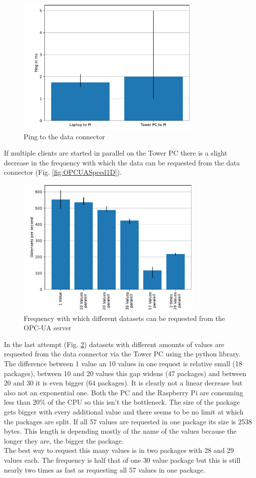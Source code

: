 \documentclass[conference]{IEEEtran}
\begin{document}
\begin{figure}[htbp]
    \centerline{\includegraphics[width=9cm]{Pictures/PingDiagram.pdf}}
    \caption{Ping to the data connector}
    \label{fig:PingDiagram}
\end{figure}
If multiple clients are started in parallel on the Tower PC there is a slight decrease in the frequency with which the data can be requested from the data connector (Fig. \ref{fig:OPCUASpeed1D}).\\
\begin{figure}[htbp]
    \centerline{\includegraphics[width=9.1cm]{Pictures/OPCUAMultipleDatenAufEinmal.pdf}}
    \caption{Frequency with which different datasets can be requested from the OPC-UA server}
    \label{fig:OPCUAMultipleDatenAufEinmal}
\end{figure}
In the last attempt (Fig. \ref{fig:OPCUAMultipleDatenAufEinmal}) datasets with different amounts of values are requested from the data connector via the Tower PC using the python library.
The difference between 1 value an 10 values in one request is relative small (18 packages), between 10 and 20 values this gap widens (47 packages) and between 20 and 30 it is even bigger (64 packages).
It is clearly not a linear decrease but also not an exponential one. 
Both the PC and the Raspberry Pi are consuming less than 20\% of the CPU so this isn't the bottleneck.
The size of the package gets bigger with every additional value and there seems to be no limit at which the packages are split.
If all 57 values are requested in one package its size is 2538 bytes.
This length is depending mostly of the name of the values because the longer they are, the bigger the package.\\
The best way to request this many values is in two packages with 28 and 29 values each.
The frequency is half that of one 30 value package but this is still nearly two times as fast as requesting all 57 values in one package.
\end{document}

